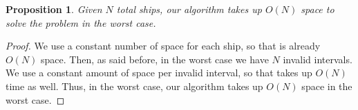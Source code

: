 \documentclass[12pt]{article}
\newtheorem{proposition}[theorem]{Proposition}
\begin{document}
\begin{proposition}
    Given $N$ total ships, our algorithm takes up $O(N)$ space to
    solve the problem in the worst case.
\end{proposition}

\begin{proof}
    We use a constant number of space for each ship, so that is
    already $O(N)$ space. Then, as said before, in the worst case
    we have $N$ invalid intervals. We use a constant amount of space
    per invalid interval, so that takes up $O(N)$ time as well. Thus,
    in the worst case, our algorithm takes up $O(N)$ space in the
    worst case.
\end{proof}


\end{document}
